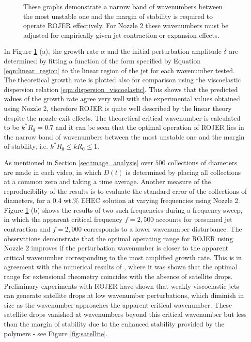 \documentclass[11pt]{article}
\begin{document}
\begin{figure}[h]
\begin{subfigure}
		\caption{The normalised jet midfilament diameter $D(t)/D_0$ for EHEC wt.\% $\left(Oh = 0.07, We = 20.5 \right)$. The jet is perturbed at apparent critical frequency $f = 2,500 Hz$ corresponding to the most amplified growth rate, and a lower frequency $f = 2,000 Hz$ corresponding to a wavenumber lower than the critical.}
	\end{subfigure}
	\caption{These graphs demonstrate a narrow band of wavenumbers between the most unstable one and the margin of stability is required to operate ROJER effectively. For Nozzle 2 these wavenumbers must be adjusted for empirically given jet contraction or expansion effects.}
	\label{fig:sweep7}
\end{figure}

In Figure \ref{fig:sweep7} (a), the growth rate $\alpha$ and the initial perturbation amplitude $\delta$ are determined by fitting a function of the form specified by Equation \ref{eqn:linear_region} to the linear region of the jet for each wavenumber tested. The theoretical growth rate is plotted also for comparison using the viscoelastic dispersion relation \ref{eqn:dispersion_viscoelastic}. This shows that the predicted values of the growth rate agree very well with the experimental values obtained using Nozzle 2, therefore ROJER is quite well described by the linear theory despite the nozzle exit effects. The theoretical critical wavenumber is calculated to be $k^*R_0 = 0.7$ and it can be seen that the optimal operation of ROJER lies in the narrow band of wavenumbers between the most unstable one and the margin of stability, i.e. $k^* R_0 \leq k R_0 \leq 1$.

As mentioned in Section \ref{sec:image_analysis} over $500$ collections of diameters are made in each video, in which $D(t)$ is determined by placing all collections at a common zero and taking a time average. Another measure of the reproducibility of the results is to evaluate the standard error of the collections of diameters, for a 0.4 wt.\% EHEC solution at varying frequencies using Nozzle 2. Figure \ref{fig:sweep7} (b) shows the results of two such frequencies during a frequency sweep, in which the apparent critical frequency $f = 2,500$ accounts for presumed jet contraction and $f = 2,000$ corresponds to a lower wavenumber disturbance. The observations demonstrate that the optimal operating range for ROJER using Nozzle 2 improves if the perturbation wavenumber is closer to the apparent critical wavenumber corresponding to the most amplified growth rate. This is in agreement with the numerical results of \cite{ardekani2010dynamics}, where it was shown that the optimal range for extensional rheometry coincides with the absence of satellite drops. Preliminary experiments with ROJER have shown that weakly viscoelastic jets can generate satellite drops at low wavenumber perturbations, which diminish in size as the wavenumber approaches the apparent critical wavenumber. These satellite drops vanished at wavenumbers beyond this critical wavenumber but less than the margin of stability due to the enhanced stability provided by the polymers - see Figure \ref{fig:satellite}. 
\end{document}
